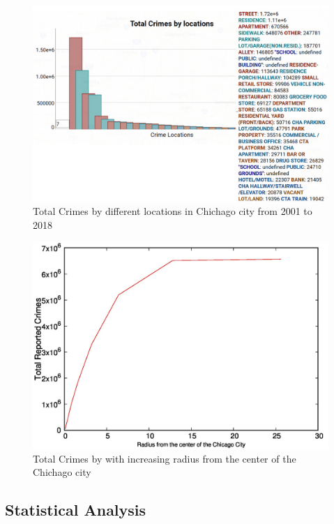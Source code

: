 \begin{figure}[htb]
	\centering\includegraphics[width=\columnwidth]{images/geo3.jpg}
	\caption{Total Crimes by different locations in Chichago city
        from 2001 to 2018}\label{fig:year-top10crimes-local-geo3}
\end{figure}

\begin{figure}[htb]
	\centering\includegraphics[width=\columnwidth]{images/geo4.jpg}
	\caption{Total Crimes by with increasing radius from the center
        of the Chichago city}\label{fig:crimes-with-radius-geo4}
\end{figure}

\subsection{Statistical Analysis}

